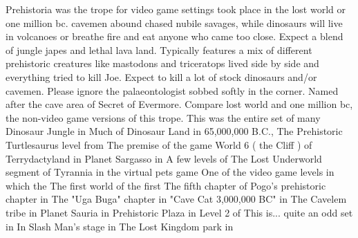 \documentclass[12pt]{book}
\begin{document}
Prehistoria was the trope for video game settings took place in the lost world or one million bc. cavemen abound chased nubile savages, while dinosaurs will live in volcanoes or breathe fire and eat anyone who came too close. Expect a blend of jungle japes and lethal lava land. Typically features a mix of different prehistoric creatures  like mastodons and triceratops lived side by side and everything tried to kill Joe. Expect to kill a lot of stock dinosaurs and/or cavemen. Please ignore the palaeontologist sobbed softly in the corner. Named after the cave area of Secret of Evermore. Compare lost world and one million bc, the non-video game versions of this trope. This was the entire set of many Dinosaur Jungle in Much of Dinosaur Land in 65,000,000 B.C., The Prehistoric Turtlesaurus level from The premise of the game World 6 ( the Cliff ) of Terrydactyland in Planet Sargasso in A few levels of The Lost Underworld segment of Tyrannia in the virtual pets game One of the video game levels in which the The first world of the first The fifth chapter of Pogo's prehistoric chapter in The "Uga Buga" chapter in "Cave Cat 3,000,000 BC" in The Cavelem tribe in Planet Sauria in Prehistoric Plaza in Level 2 of This is... quite an odd set in In Slash Man's stage in The Lost Kingdom park in
\end{document}
